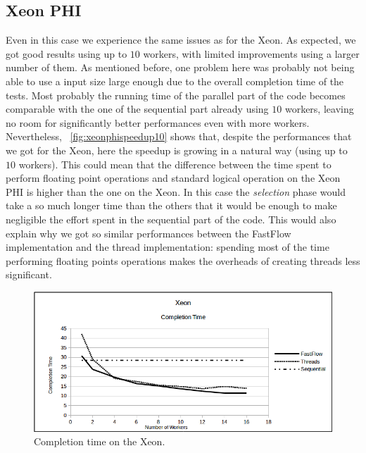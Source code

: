 \documentclass[10pt]{article}
\numberwithin{equation}{section}
\begin{document}
\subsection{Xeon PHI}
Even in this case we experience the same issues as for the Xeon. As expected, we got good results using up to $10$ workers, with limited improvements using a larger number of them. As mentioned before, one problem here was probably not being able to use a input size large enough due to the overall completion time of the tests. Most probably the running time of the parallel part of the code becomes comparable with the one of the sequential part already using $10$ workers, leaving no room for significantly better performances even with more workers. Nevertheless, \figurename~\ref{fig:xeonphispeedup10} shows that, despite the performances that we got for the Xeon, here the speedup is growing in a natural way (using up to $10$ workers). This could mean that the difference between the time spent to perform floating point operations and standard logical operation on the Xeon PHI is higher than the one on the Xeon. In this case the \emph{selection} phase would take a so much longer time than the others that it would be enough to make negligible the effort spent in the sequential part of the code. This would also explain why we got so similar performances between the FastFlow implementation and the thread implementation: spending most of the time performing floating points operations makes the overheads of creating threads less significant.
\begin{figure} 
	\centering
	\includegraphics[scale=.75]{Xeon_CompletionTime.png}
	\caption{Completion time on the Xeon.}
	\label{fig:xeoncompletiontime}
\end{figure}
\end{document}
